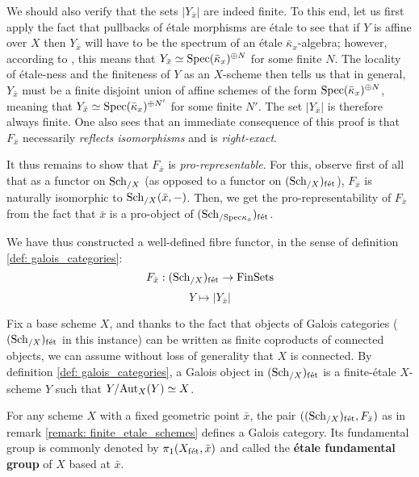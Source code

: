 \begin{remark}
                We should also verify that the sets $|Y_{\bar{x}}|$ are indeed finite. To this end, let us first apply the fact that pullbacks of \'etale morphisms are \'etale to see that if $Y$ is affine over $X$ then $Y_{\bar{x}}$ will have to be the spectrum of an \'etale $\bar{\kappa}_x$-algebra; however, according to \cite[\href{https://stacks.math.columbia.edu/tag/00U3}{Tag 00U3}]{stacks}, this means that $Y_{\bar{x}} \simeq \mathrm{Spec} (\bar{\kappa}_x)^{\oplus N}$ for some finite $N$. The locality of \'etale-ness and the finiteness of $Y$ as an $X$-scheme then tells us that in general, $Y_{\bar{x}}$ must be a finite disjoint union of affine schemes of the form $\mathrm{Spec} (\bar{\kappa}_x)^{\oplus N}$, meaning that $Y_{\bar{x}} \simeq \mathrm{Spec} (\bar{\kappa}_x)^{\oplus N'}$ for some finite $N'$. The set $|Y_{\bar{x}}|$ is therefore always finite. One also sees that an immediate consequence of this proof is that $F_{\bar{x}}$ necessarily \textit{reflects isomorphisms} and is \textit{right-exact}. 
                
                It thus remains to show that $F_{\bar{x}}$ is \textit{pro-representable}. For this, observe first of all that as a functor on $\mathrm{Sch}_{/X}$ (as opposed to a functor on $(\mathrm{Sch}_{/X})_{\mathrm{f\acute{e}t}}$), $F_{\bar{x}}$ is naturally isomorphic to $\mathrm{Sch}_{/X}(\bar{x}, -)$. Then, we get the pro-representability of $F_{\bar{x}}$ from the fact that $\bar{x}$ is a pro-object of $(\mathrm{Sch}_{/\mathrm{Spec} \kappa_x})_{\mathrm{f\acute{e}t}}$.
                
                We have thus constructed a well-defined fibre functor, in the sense of definition \ref{def: galois_categories}:
                    $$F_{\bar{x}}: (\mathrm{Sch}_{/X})_{\mathrm{f\acute{e}t}} \to \mathrm{Fin}\mathrm{Sets}$$
                    $$Y \mapsto |Y_{\bar{x}}|$$
            \end{remark}
            \begin{remark} \label{remark: galois_schemes}
                Fix a base scheme $X$, and thanks to the fact that objects of Galois categories ($(\mathrm{Sch}_{/X})_{\mathrm{f\acute{e}t}}$ in this instance) can be written as finite coproducts of connected objects, we can assume without loss of generality that $X$ is connected. By definition \ref{def: galois_categories}, a Galois object in $(\mathrm{Sch}_{/X})_{\mathrm{f\acute{e}t}}$ is a finite-\'etale $X$-scheme $Y$ such that $Y/\mathrm{Aut}_X(Y) \simeq X$. 
            \end{remark}
            \begin{definition} \label{def: etale_fundamental_groups}
                For any scheme $X$ with a fixed geometric point $\bar{x}$, the pair $((\mathrm{Sch}_{/X})_{\mathrm{f\acute{e}t}}, F_{\bar{x}})$ as in remark \ref{remark: finite_etale_schemes} defines a Galois category. Its fundamental group is commonly denoted by $\pi_1(X_{\mathrm{f\acute{e}t}}, \bar{x})$ and called the \textbf{\'etale fundamental group} of $X$ based at $\bar{x}$.
            \end{definition}
